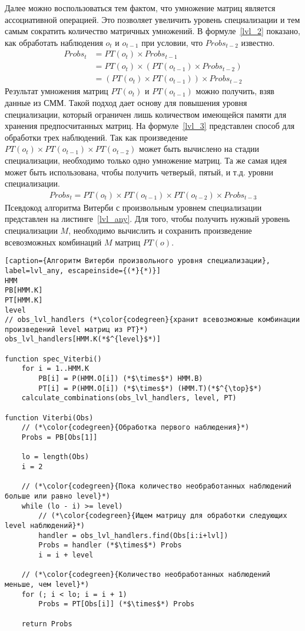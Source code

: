 Далее можно воспользоваться тем фактом, что умножение матриц 
является ассоциативной операцией.
Это позволяет увеличить уровень специализации и тем самым 
сократить количество матричных умножений.
В формуле~\ref{lvl_2} показано, как обработать наблюдения $o_{t}$ и $o_{t-1}$ при условии, 
что $Probs_{t-2}$ известно.
\begin{align}
  \mathit{Probs}_{t} &= \mathit{PT}(\mathit{o}_{t}) \times \mathit{Probs}_{t-1}\nonumber\\
  &= \mathit{PT}(\mathit{o}_{t}) \times (\mathit{PT}(\mathit{o}_{t-1}) \times \mathit{Probs}_{t-2}) \nonumber\\
  & =(\mathit{PT}(\mathit{o}_{t}) \times \mathit{PT}(\mathit{o}_{t-1})) \times \mathit{Probs}_{t-2}
\label{lvl_2}
\end{align}
Результат умножения матриц $PT(o_t)$ и $PT(o_{t-1})$
можно получить, взяв данные из СММ.
Такой подход дает основу для повышения уровня специализации, 
который ограничен лишь количеством имеющейся памяти для хранения предпосчитанных матриц.
На формуле~\ref{lvl_3} представлен способ для обработки трех 
наблюдений.
Так как произведение $\mathit{PT}(o_t) \times \mathit{PT}(o_{t-1}) \times \mathit{PT}(o_{t-2})$
может быть вычислено на стадии специализации, необходимо 
только одно умножение матриц.
Та же самая идея может быть использована, чтобы получить 
четверый, пятый, и т.д. уровни специализации.
\begin{align}
  \mathit{Probs}_{t} = \mathit{PT}(o_t) \times \mathit{PT}(o_{t-1}) \times \mathit{PT}(o_{t-2}) \times \mathit{Probs}_{t - 3} 
\label{lvl_3}
\end{align}
Псевдокод алгоритма Витерби с произвольным уровнем 
специализации представлен на листинге~\ref{lvl_any}.
Для того, чтобы получить нужный уровень специализации $M$, 
необходимо вычислить и сохранить произведение всевозможных 
комбинаций $M$ матриц $PT(o)$.
\begin{lstlisting}[caption={Алгоритм Витерби произвольного уровня специализации}, label=lvl_any, escapeinside={(*}{*)}]
HMM
PB[HMM.K]
PT[HMM.K]
level
// obs_lvl_handlers (*\color{codegreen}{хранит всевозможные комбинации произведений level матриц из PT}*)
obs_lvl_handlers[HMM.K(*$^{level}$*)]

function spec_Viterbi()
	for i = 1..HMM.K
		PB[i] = P(HMM.O[i]) (*$\times$*) HMM.B)
		PT[i] = P(HMM.O[i]) (*$\times$*) (HMM.T)(*$^{\top}$*)
	calculate_combinations(obs_lvl_handlers, level, PT)

function Viterbi(Obs)
	// (*\color{codegreen}{Обработка первого наблюдения}*)
	Probs = PB[Obs[1]]

	lo = length(Obs)
	i = 2

	// (*\color{codegreen}{Пока количество необработанных наблюдений больше или равно level}*)
	while (lo - i) >= level)
		// (*\color{codegreen}{Ищем матрицу для обработки следующих level наблюдений}*)
		handler = obs_lvl_handlers.find(Obs[i:i+lvl])
		Probs = handler (*$\times$*) Probs
		i = i + level
	
	// (*\color{codegreen}{Количество необработанных наблюдений меньше, чем level}*)
	for (; i < lo; i = i + 1)
		Probs = PT[Obs[i]] (*$\times$*) Probs

	return Probs
\end{lstlisting}
